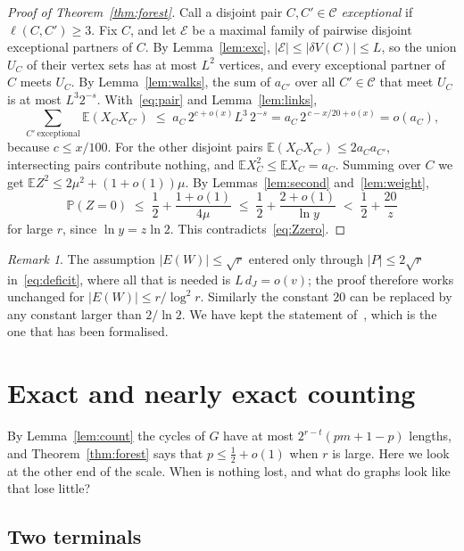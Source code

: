 \documentclass[11pt]{article}
\theoremstyle{definition}
\theoremstyle{remark}
\newtheorem{remark}[theorem]{Remark}
\newcommand{\PP}{\mathbb{P}}
\newcommand{\EE}{\mathbb{E}}
\newcommand{\half}{\tfrac12}
\begin{document}
\begin{proof}[Proof of Theorem~\ref{thm:forest}]
Call a disjoint pair $C,C'\in\mathcal{C}$ \emph{exceptional} if $\ell(C,C')\ge3$. Fix $C$, and let
$\mathcal{E}$ be a maximal family of pairwise disjoint exceptional partners of $C$. By
Lemma~\ref{lem:exc}, $|\mathcal{E}|\le|\delta V(C)|\le L$, so the union $U_C$ of their vertex sets
has at most $L^{2}$ vertices, and every exceptional partner of $C$ meets $U_C$. By
Lemma~\ref{lem:walks}, the sum of $a_{C'}$ over all $C'\in\mathcal{C}$ that meet $U_C$ is at most
$L^{3}2^{-s}$. With~\eqref{eq:pair} and Lemma~\ref{lem:links},
\[
  \sum_{C'\ \mathrm{exceptional}}\EE(X_CX_{C'})\;\le\;a_C\,2^{c+o(x)}L^{3}\,2^{-s}
  =a_C\,2^{\,c-x/20+o(x)}=o(a_C),
\]
because $c\le x/100$. For the other disjoint pairs $\EE(X_CX_{C'})\le2a_Ca_{C'}$, intersecting pairs
contribute nothing, and $\EE X_C^{2}\le\EE X_C=a_C$. Summing over $C$ we get
$\EE Z^{2}\le2\mu^{2}+(1+o(1))\mu$. By Lemmas~\ref{lem:second} and~\ref{lem:weight},
\[
  \PP(Z=0)\;\le\;\frac12+\frac{1+o(1)}{4\mu}\;\le\;\frac12+\frac{2+o(1)}{\ln y}\;<\;\frac12+\frac{20}{z}
\]
for large $r$, since $\ln y=z\ln2$. This contradicts~\eqref{eq:Zzero}.
\end{proof}

\begin{remark}\label{rem:range}
The assumption $|E(W)|\le\sqrt r$ entered only through $|P|\le2\sqrt r$ in~\eqref{eq:deficit}, where
all that is needed is $L\,d_J=o(v)$; the proof therefore works unchanged for
$|E(W)|\le r/\log^{2}r$. Similarly the constant $20$ can be replaced by any constant larger than
$2/\ln2$. We have kept the statement of~\cite{KNT}, which is the one that has been formalised.
\end{remark}

\section{Exact and nearly exact counting}\label{sec:exact}

By Lemma~\ref{lem:count} the cycles of $G$ have at most $2^{r-t}(pm+1-p)$ lengths, and
Theorem~\ref{thm:forest} says that $p\le\half+o(1)$ when $r$ is large. Here we look at the other end
of the scale. When is nothing lost, and what do graphs look like that lose little?

\subsection{Two terminals}
\end{document}
